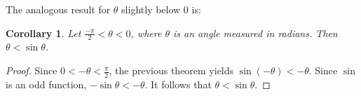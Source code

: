 \documentclass[12pt]{article}
\newtheorem{cor*}{Corollary}
\begin{document}
The analogous result for $\theta$ slightly below 0 is:

\begin{cor*}
Let $\displaystyle \frac{-\pi}{2}< \theta <0$, where $\theta$ is an angle measured in radians.  Then $\theta < \sin \theta$.
\end{cor*}

\begin{proof}
Since $\displaystyle 0< -\theta < \frac{\pi}{2}$, the previous theorem yields $\sin (-\theta)<-\theta$.  Since $\sin$ is an odd function, $-\sin \theta < -\theta$.  It follows that $\theta < \sin \theta$.
\end{proof}
\end{document}
